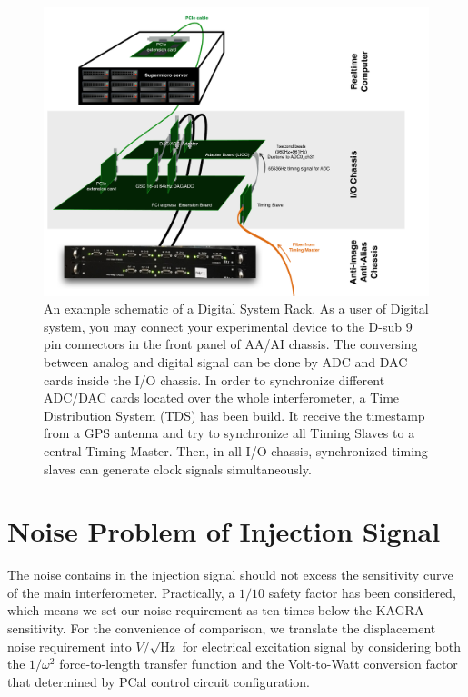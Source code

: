 \begin{figure}[hbt!]
\centering
\includegraphics[width=1\textwidth]{figure/dgs}
\caption[An example schematic of a Digital System Rack]{ An example schematic of a Digital System Rack. As a user of Digital system, you may connect your experimental device to the D-sub 9 pin connectors in the front panel of AA/AI chassis. The conversing between analog and digital signal can be done by ADC and DAC cards inside the I/O chassis. In order to synchronize different ADC/DAC cards located over the whole interferometer, a Time Distribution System (TDS) has been build. It receive the timestamp from a GPS antenna and try to synchronize all Timing Slaves to a central Timing Master. Then, in all I/O chassis, synchronized timing slaves can generate clock signals simultaneously.  }
\label{fig:dgs}
\end{figure}



\clearpage
\section{Noise Problem of Injection Signal}

The noise contains in the injection signal should not excess the sensitivity curve of the main interferometer. Practically, a $1/10$ safety factor has been considered, which means we set our noise requirement as ten times below the KAGRA sensitivity\cite{kagra:sn}. For the convenience of comparison, we translate the displacement noise requirement into $V/\sqrt{\mathrm{Hz}}$ for electrical excitation signal by considering both the $1/\omega^2$ force-to-length transfer function and the Volt-to-Watt conversion factor that determined by PCal control circuit configuration.


